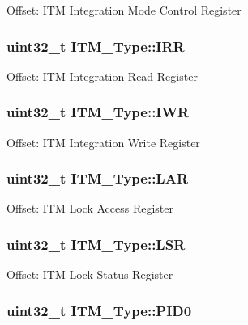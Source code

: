 Offset\-: I\-T\-M Integration Mode Control Register \hypertarget{struct_i_t_m___type_ae43a66174b8ab182ff595e5f5da9f235}{
\subsubsection[{I\-R\-R}]{ uint32\-\_\-t I\-T\-M\-\_\-\-Type\-::\-I\-R\-R}}\label{struct_i_t_m___type_ae43a66174b8ab182ff595e5f5da9f235}
Offset\-: I\-T\-M Integration Read Register \hypertarget{struct_i_t_m___type_af53499fc94cda629afb2fec858d2ad1c}{
\subsubsection[{I\-W\-R}]{ uint32\-\_\-t I\-T\-M\-\_\-\-Type\-::\-I\-W\-R}}\label{struct_i_t_m___type_af53499fc94cda629afb2fec858d2ad1c}
Offset\-: I\-T\-M Integration Write Register \hypertarget{struct_i_t_m___type_a33025af19748bd3ca5cf9d6b14150001}{
\subsubsection[{L\-A\-R}]{ uint32\-\_\-t I\-T\-M\-\_\-\-Type\-::\-L\-A\-R}}\label{struct_i_t_m___type_a33025af19748bd3ca5cf9d6b14150001}
Offset\-: I\-T\-M Lock Access Register \hypertarget{struct_i_t_m___type_a56f607260c4175c5f37a28e47ab3d1e5}{
\subsubsection[{L\-S\-R}]{ uint32\-\_\-t I\-T\-M\-\_\-\-Type\-::\-L\-S\-R}}\label{struct_i_t_m___type_a56f607260c4175c5f37a28e47ab3d1e5}
Offset\-: I\-T\-M Lock Status Register \hypertarget{struct_i_t_m___type_ab69ade751350a7758affdfe396517535}{
\subsubsection[{P\-I\-D0}]{ uint32\-\_\-t I\-T\-M\-\_\-\-Type\-::\-P\-I\-D0}}\label{struct_i_t_m___type_ab69ade751350a7758affdfe396517535}
